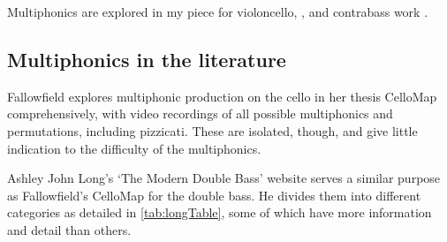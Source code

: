 Multiphonics are explored in my piece for violoncello, , and contrabass work .

\subsection{Multiphonics in the literature}

Fallowfield explores multiphonic production on the cello in her thesis CelloMap comprehensively, with video recordings of all possible multiphonics and permutations, including pizzicati.\autocite{fallowfieldCelloMapHandbook2009} 
These are isolated, though, and give little indication to the difficulty of the multiphonics.

Ashley John Long's `The Modern Double Bass' website serves a similar purpose as Fallowfield's CelloMap for the double bass.\autocite{longModernDoubleBass} 
He divides them into different categories as detailed in \autoref{tab:longTable}, some of which have more information and detail than others. 

\begin{table}[]
  \centering
  \caption{The different types of multiphonics according to Long}
  \label{tab:longTable}
  \end{table}

